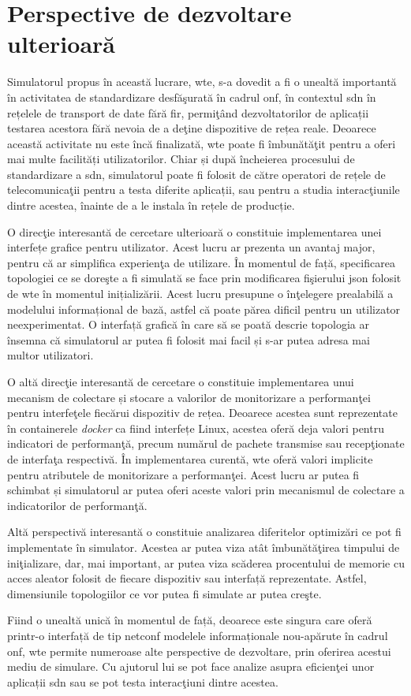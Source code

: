 \section{Perspective de dezvoltare ulterioară}

Simulatorul propus în această lucrare, \gls{wte}, s-a dovedit a fi o unealtă importantă în activitatea de standardizare desfăşurată în cadrul \gls{onf}, în contextul \gls{sdn} în rețelele de transport de date fără fir, permiţând dezvoltatorilor de aplicații testarea acestora fără nevoia de a deţine dispozitive de rețea reale. Deoarece această activitate nu este încă finalizată, \gls{wte} poate fi îmbunătăţit pentru a oferi mai multe facilități utilizatorilor. Chiar și după încheierea procesului de standardizare a \gls{sdn}, simulatorul poate fi folosit de către operatori de rețele de telecomunicaţii pentru a testa diferite aplicații, sau pentru a studia interacţiunile dintre acestea, înainte de a le instala în rețele de producție.

O direcţie interesantă de cercetare ulterioară o constituie implementarea unei interfețe grafice pentru utilizator. Acest lucru ar prezenta un avantaj major, pentru că ar simplifica experienţa de utilizare. În momentul de față, specificarea topologiei ce se doreşte a fi simulată se face prin modificarea fişierului \gls{json} folosit de \gls{wte} în momentul inițializării. Acest lucru presupune o înţelegere prealabilă a modelului informațional de bază, astfel că poate părea dificil pentru un utilizator neexperimentat. O interfață grafică în care să se poată descrie topologia ar însemna că simulatorul ar putea fi folosit mai facil și s-ar putea adresa mai multor utilizatori.

O altă direcţie interesantă de cercetare o constituie implementarea unui mecanism de colectare și stocare a valorilor de monitorizare a performanţei pentru interfeţele fiecărui dispozitiv de rețea. Deoarece acestea sunt reprezentate în containerele \textit{docker} ca fiind interfețe Linux, acestea oferă deja valori pentru indicatori de performanţă, precum numărul de pachete transmise sau recepţionate de interfaţa respectivă. În implementarea curentă, \gls{wte} oferă valori implicite pentru atributele de monitorizare a performanţei. Acest lucru ar putea fi schimbat și simulatorul ar putea oferi aceste valori prin mecanismul de colectare a indicatorilor de performanţă.

Altă perspectivă interesantă o constituie analizarea diferitelor optimizări ce pot fi implementate în simulator. Acestea ar putea viza atât îmbunătăţirea timpului de iniţializare, dar, mai important, ar putea viza scăderea procentului de memorie cu acces aleator folosit de fiecare dispozitiv sau interfață reprezentate. Astfel, dimensiunile topologiilor ce vor putea fi simulate ar putea creşte.

Fiind o unealtă unică în momentul de față, deoarece este singura care oferă printr-o interfață de tip \gls{netconf} modelele informaționale nou-apărute în cadrul \gls{onf}, \gls{wte} permite numeroase alte perspective de dezvoltare, prin oferirea acestui mediu de simulare. Cu ajutorul lui se pot face analize asupra eficienţei unor aplicații \gls{sdn} sau se pot testa interacţiuni dintre acestea.